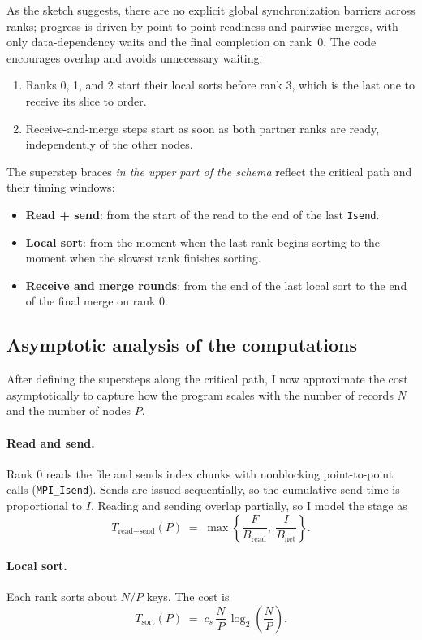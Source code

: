 \documentclass[12pt]{article}
\begin{document}
As the sketch suggests, there are no explicit global synchronization barriers across ranks; progress is driven by point-to-point readiness and pairwise merges, with only data-dependency waits and the final completion on rank~0. The code encourages overlap and avoids unnecessary waiting:
\begin{enumerate}
  \item Ranks 0, 1, and 2 start their local sorts before rank 3, which is the last one to receive its slice to order.
  \item Receive-and-merge steps start as soon as both partner ranks are ready, independently of the other nodes.
\end{enumerate}

The superstep braces \emph{in the upper part of the schema} reflect the critical path and their timing windows:
\begin{itemize}
  \item \textbf{Read + send}: from the start of the read to the end of the last \texttt{Isend}.
  \item \textbf{Local sort}: from the moment when the last rank begins sorting to the moment when the slowest rank finishes sorting.
  \item \textbf{Receive and merge rounds}: from the end of the last local sort to the end of the final merge on rank 0.
\end{itemize}

\subsection{Asymptotic analysis of the computations}
After defining the supersteps along the critical path, I now approximate the cost asymptotically to capture how the program scales with the number of records \(N\) and the number of nodes \(P\).

\paragraph{Read and send.}
Rank 0 reads the file and sends index chunks with nonblocking point-to-point calls (\texttt{MPI\_Isend}). Sends are issued sequentially, so the cumulative send time is proportional to \(I\). Reading and sending overlap partially, so I model the stage as
\[
T_{\text{read+send}}(P)
\;=\;
\max\!\left\{\frac{F}{B_{\text{read}}},\ \frac{I}{B_{\text{net}}}\right\}.
\]

\paragraph{Local sort.}
Each rank sorts about \(N/P\) keys. The cost is
\[
T_{\text{sort}}(P)
\;=\;
c_s\,\frac{N}{P}\,\log_2\!\left(\frac{N}{P}\right).
\]
\end{document}
